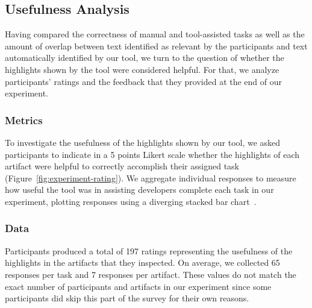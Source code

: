 

\subsection{Usefulness Analysis}
\label{cp6:usefulness}


Having compared the correctness of manual and tool-assisted tasks as well 
as the amount of overlap between text identified as relevant by the participants and 
text automatically identified by our tool, we turn to the question of 
whether the highlights shown by the tool were considered helpful. 
For that, we analyze participants' ratings and the feedback that they 
provided at the end of our experiment.








\subsubsection{Metrics}

To investigate the usefulness of the highlights shown by our tool, we asked participants to indicate in a 5 points Likert scale whether the highlights
of each artifact were helpful to correctly accomplish their assigned task (Figure~\ref{fig:experiment-rating}). We aggregate individual responses to measure how useful the tool was in assisting developers complete each task in our experiment, plotting responses using a diverging stacked bar chart~\cite{spence2001info-viz}.



\subsubsection{Data}


Participants produced a total of 197 ratings representing the usefulness of the highlights in the artifacts that they inspected.
On average, we collected 65 responses per task and 7 responses per artifact.  
These values do not match the exact number of participants and artifacts in our experiment since some participants did skip this part of 
the survey for their own reasons.



